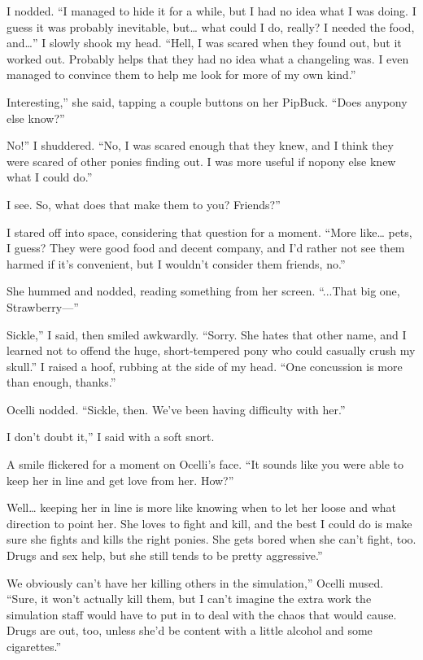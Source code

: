 I nodded. “I managed to hide it for a while, but I had no idea what I was doing. I guess it was probably inevitable, but… what could I do, really? I needed the food, and…” I slowly shook my head. “Hell, I was scared when they found out, but it worked out. Probably helps that they had no idea what a changeling was. I even managed to convince them to help me look for more of my own kind.”

\leavevmode{}Interesting,” she said, tapping a couple buttons on her PipBuck. “Does anypony else know?”

\leavevmode{}No!” I shuddered. “No, I was scared enough that they knew, and I think they were scared of other ponies finding out. I was more useful if nopony else knew what I could do.”

\leavevmode{}I see. So, what does that make them to you? Friends?”

I stared off into space, considering that question for a moment. “More like… pets, I guess? They were good food and decent company, and I’d rather not see them harmed if it’s convenient, but I wouldn’t consider them friends, no.”

She hummed and nodded, reading something from her screen. “...That big one, Strawberry—”

\leavevmode{}Sickle,” I said, then smiled awkwardly. “Sorry. She hates that other name, and I learned not to offend the huge, short-tempered pony who could casually crush my skull.” I raised a hoof, rubbing at the side of my head. “One concussion is more than enough, thanks.”

Ocelli nodded. “Sickle, then. We’ve been having difficulty with her.”

\leavevmode{}I don’t doubt it,” I said with a soft snort.

A smile flickered for a moment on Ocelli’s face. “It sounds like you were able to keep her in line and get love from her. How?”

\leavevmode{}Well… keeping her in line is more like knowing when to let her loose and what direction to point her. She loves to fight and kill, and the best I could do is make sure she fights and kills the right ponies. She gets bored when she can’t fight, too. Drugs and sex help, but she still tends to be pretty aggressive.”

\leavevmode{}We obviously can’t have her killing others in the simulation,” Ocelli mused. “Sure, it won’t actually kill them, but I can’t imagine the extra work the simulation staff would have to put in to deal with the chaos that would cause. Drugs are out, too, unless she’d be content with a little alcohol and some cigarettes.”

